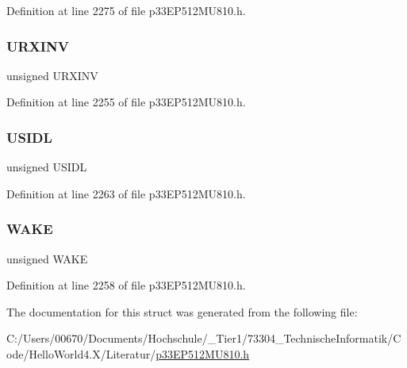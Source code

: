 Definition at line 2275 of file p33\+E\+P512\+M\+U810.\+h.

\mbox{\label{structtag_u4_m_o_d_e_b_i_t_s_ab6387939f9a8bc487f0eab6e20afd53d}} 
\subsubsection{\texorpdfstring{U\+R\+X\+I\+NV}{URXINV}}
{\footnotesize\ttfamily unsigned U\+R\+X\+I\+NV}



Definition at line 2255 of file p33\+E\+P512\+M\+U810.\+h.

\mbox{\label{structtag_u4_m_o_d_e_b_i_t_s_a94d25c6c9271a4ab4f450319e34e2a00}} 
\subsubsection{\texorpdfstring{U\+S\+I\+DL}{USIDL}}
{\footnotesize\ttfamily unsigned U\+S\+I\+DL}



Definition at line 2263 of file p33\+E\+P512\+M\+U810.\+h.

\mbox{\label{structtag_u4_m_o_d_e_b_i_t_s_a364c8b1b2c2f66b23dd1093ced3e20dd}} 
\subsubsection{\texorpdfstring{W\+A\+KE}{WAKE}}
{\footnotesize\ttfamily unsigned W\+A\+KE}



Definition at line 2258 of file p33\+E\+P512\+M\+U810.\+h.



The documentation for this struct was generated from the following file\+:\begin{DoxyCompactItemize}
\item 
C\+:/\+Users/00670/\+Documents/\+Hochschule/\+\_\+\+Tier1/73304\+\_\+\+Technische\+Informatik/\+Code/\+Hello\+World4.\+X/\+Literatur/\hyperlink{p33_e_p512_m_u810_8h}{p33\+E\+P512\+M\+U810.\+h}\end{DoxyCompactItemize}
